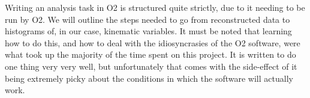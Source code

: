 Writing an analysis task in O2 is structured quite strictly, due to it needing to be run by O2. We will outline the steps needed to go from reconstructed data to histograms of, in our case, kinematic variables. It must be noted that learning how to do this, and how to deal with the idiosyncrasies of the O2 software, were what took up the majority of the time spent on this project. It is written to do one thing very very well, but unfortunately that comes with the side-effect of it being extremely picky about the conditions in which the software will actually work. 

\subsection{}